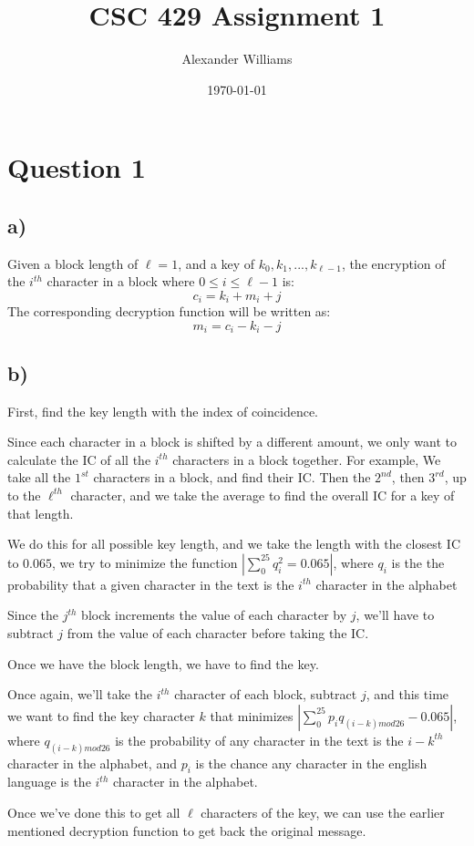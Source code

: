 \documentclass{article}
\title{CSC 429 Assignment 1}
\author{Alexander Williams}
\date{\today}
\begin{document}
\maketitle
\section*{Question 1}
\subsection*{a)}
Given a block length of $\ell=1$, and a key of $k_0,k_1,...,k_{\ell-1}$,
the encryption of the $i^{th}$ character in a block where $0\leq{}i\leq\ell-1$ is:
$$
c_i=k_i+m_i+j
$$
The corresponding decryption function will be written as:
$$
m_i=c_i-k_i-j
$$

\subsection*{b)}
First, find the key length with the index of coincidence.

Since each character in a block is shifted by a different amount, we only want
to calculate the IC of all the $i^{th}$ characters in a block together. For
example, We take all the $1^{st}$ characters in a block, and find their IC.
Then the $2^{nd}$, then $3^{rd}$, up to the $\ell^{th}$ character, and we take 
the average to find the overall IC for a key of that length.

We do this for all possible key length, and we take the length with the closest
IC to $0.065$, we try to minimize the function
$|\sum_{0}^{25}{q_i^2}=0.065|$,
where $q_i$ is the the probability that a given character in the text is the
$i^{th}$ character in the alphabet

Since the $j^{th}$ block increments the value of each character by $j$, we'll have
to subtract $j$ from the value of each character before taking the IC.

Once we have the block length, we have to find the key.

Once again, we'll take the $i^{th}$ character of each block, subtract $j$, and
this time we want to find the key character $k$ that minimizes
$|\sum_{0}^{25}p_iq_{(i-k)mod26}-0.065|$, where $q_{(i-k)mod26}$ is the probability 
of any character in the text is the $i-k^{th}$ character in the alphabet,
and $p_i$ is the chance any character in the english language is the $i^{th}$
character in the alphabet.

Once we've done this to get all $\ell$ characters of the key, we can use the 
earlier mentioned decryption function to get back the original message.
\end{document}
